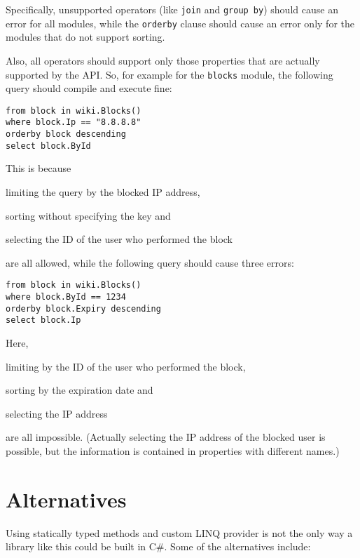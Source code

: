 Specifically, unsupported operators (like \lstinline{join} and \lstinline{group by}) should cause an error for all modules,
while the \lstinline{orderby} clause should cause an error only for the modules that do not support sorting.

Also, all operators should support only those properties that are actually supported by the \ac{API}.
So, for example for the \texttt{blocks} module, the following query should compile and execute fine:

\begin{lstlisting}
from block in wiki.Blocks()
where block.Ip == "8.8.8.8"
orderby block descending
select block.ById
\end{lstlisting}

This is because
\begin{compactitem}
\item limiting the query by the blocked \ac{IP} address,
\item sorting without specifying the key and
\item selecting the ID of the user who performed the block
\end{compactitem}
are all allowed, while the following query should cause three errors:

\begin{lstlisting}
from block in wiki.Blocks()
where block.ById == 1234
orderby block.Expiry descending
select block.Ip
\end{lstlisting}

Here,
\begin{compactitem}
\item limiting by the ID of the user who performed the block,
\item sorting by the expiration date and
\item selecting the \ac{IP} address
\end{compactitem}
are all impossible.
(Actually selecting the \ac{IP} address of the blocked user is possible,
but the information is contained in properties with different names.)

\section{Alternatives}
\label{alternatives}

Using statically typed methods and custom LINQ provider is not the only way a library like this
could be built in C\#.
Some of the alternatives include:

